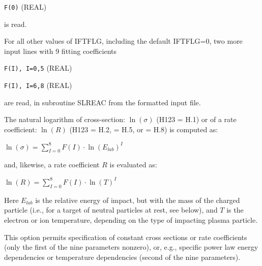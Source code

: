 \begin{description}
\begin{description}
                \lstinline|F(0)| (REAL) 

                is read.

                For all other values of IFTFLG, including the default IFTFLG=0, two more input
                lines with 9 fitting coefficients 

                \lstinline|F(I), I=0,5| (REAL) 

                \lstinline|F(I), I=6,8| (REAL) 

                are read, in subroutine SLREAC from the formatted input file.

                The natural logarithm of cross-section: $\ln(\sigma)$ (H123 = H.1) or of a rate
                coefficient: $\ln(R)$ (H123 = H.2, = H.5, or = H.8) is computed as:

                $\ln(\sigma) = \sum_{I=0}^8 F(I) \cdot \ln(E_{lab})^I $ 

                and, likewise, a rate coefficient $R$ is evaluated as:

                $\ln(R) = \sum_{I=0}^8 F(I) \cdot \ln(T)^I $ 

                Here $E_{lab}$ is the relative energy of impact, but with the mass of the
                charged particle (i.e., for a target of neutral particles at rest, see below),
                and $T$ is the electron or ion temperature, depending on the type of impacting
                plasma particle.

                This option permits specification of constant cross sections or rate
                coefficients (only the first of the nine parameters nonzero), or, e.g.,
                specific power law energy dependencies or temperature dependencies (second of
                the nine parameters).
        \end{description}


\end{description}
